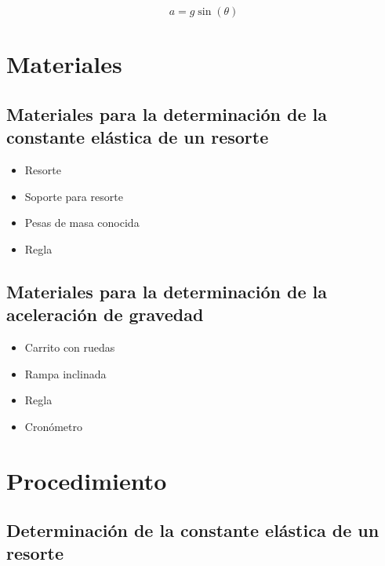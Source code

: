 \documentclass{article}
\begin{document}
\begin{multicols}{2}
            \begin{equation}
                a = g \sin(\theta)
            \end{equation}
        
\section{Materiales}

    \subsection{Materiales para la determinación de la constante elástica de un resorte}
    \begin{itemize}
        \item Resorte
        \item Soporte para resorte
        \item Pesas de masa conocida
        \item Regla
    \end{itemize}
    \subsection{Materiales para la determinación de la aceleración de gravedad}
    \begin{itemize}
        \item Carrito con ruedas
        \item Rampa inclinada
        \item Regla
        \item Cronómetro
    \end{itemize}

\section{Procedimiento}

\subsection{Determinación de la constante elástica de un resorte}


\end{multicols}
\end{document}
